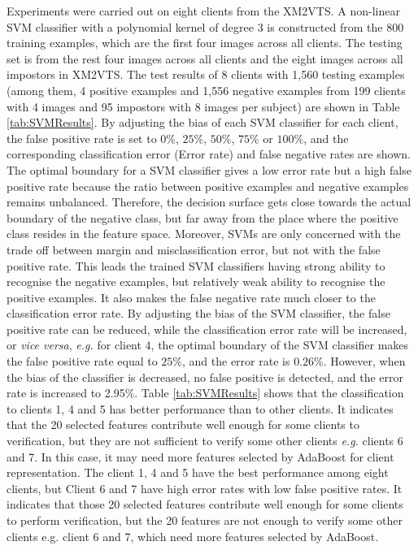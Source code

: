 Experiments were carried out on eight clients from the XM2VTS. A non-linear SVM classifier with a polynomial kernel of degree 3 is constructed from the 800 training examples, which are the first four images across all clients. The testing set is from the rest four images across all clients and the eight images across all impostors in XM2VTS. The test results of 8 clients with 1,560 testing examples (among them, 4 positive examples and 1,556 negative examples from 199 clients with 4 images and 95 impostors with 8 images per subject) are shown in \mbox{Table} \ref{tab:SVMResults}. By adjusting the bias of each SVM classifier for each client, the false positive rate is set to $0\%$, $25\%$, $50\%$, $75\%$ or $100\%$, and the corresponding classification error (Error rate) and false negative rates are shown. The optimal boundary for a SVM classifier gives a low error rate but a high false positive rate because the ratio between positive examples and negative examples remains unbalanced. Therefore, the decision surface gets close towards the actual boundary of the negative class, but far away from the place where the positive class resides in the feature space. Moreover, SVMs are only concerned with the trade off between margin and misclassification error, but not with the false positive rate. This leads the trained SVM classifiers having strong ability to recognise the negative examples, but relatively weak ability to recognise the positive examples. It also makes the false negative rate much closer to the classification error rate. By adjusting the bias of the SVM classifier, the false positive rate can be reduced, while the classification error rate will be increased, or {\it vice versa}, {\it e.g.} for client 4, the optimal boundary of the SVM classifier makes the false positive rate equal to $25\%$, and the error rate is $0.26\%$. However, when the bias of the classifier is decreased, no false positive is detected, and the error rate is increased to 2.95\%. \mbox{Table} \ref{tab:SVMResults} shows that the classification to clients 1, 4 and 5 has better performance than to other clients. It indicates that the 20 selected features contribute well enough for some clients to verification, but they are not sufficient to verify some other clients {\it e.g.} clients 6 and 7. In this case, it may need more features selected by AdaBoost for client representation. The client 1, 4 and 5 have the best performance among eight clients, but Client 6 and 7 have high error rates with low false positive rates. It indicates that those 20 selected features contribute well enough for some clients to perform verification, but the 20 features are not enough to verify some other clients e.g. client 6 and 7, which need more features selected by AdaBoost.
